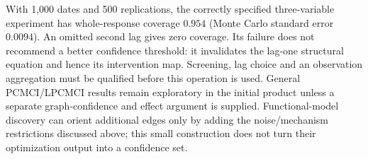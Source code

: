 With 1,000 dates and 500 replications, the correctly specified three-variable
experiment has whole-response coverage $0.954$ (Monte Carlo standard
error $0.0094$). An omitted second lag gives zero coverage. Its failure
does not recommend a better confidence threshold: it invalidates the
lag-one structural equation and hence its intervention map. Screening,
lag choice and an observation aggregation must be qualified before this
operation is used. General PCMCI/LPCMCI results remain exploratory in the
initial product unless a separate graph-confidence and effect argument
is supplied. Functional-model discovery can orient additional edges only
by adding the noise/mechanism restrictions discussed above; this small
construction does not turn their optimization output into a confidence set.
